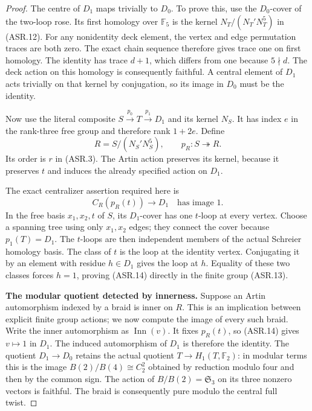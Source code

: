 \begin{proof}
The centre of $D_1$ maps trivially to $D_0$.
To prove this, use the $D_0$-cover of the two-loop rose.
Its first homology over $\mathbb F_5$ is the kernel
$N_T/(N_T'N_T^5)$ in (ASR.12).
For any nonidentity deck element, the vertex and edge
permutation traces are both zero.  The exact chain sequence
therefore gives trace one on first homology.  The identity
has trace $d+1$, which differs from one because $5\nmid d$.
The deck action on this homology is consequently faithful.
A central element of $D_1$ acts trivially on that kernel by
conjugation, so its image in $D_0$ must be the identity.

Now use the literal composite
$S\xrightarrow{p_0}T\xrightarrow{p_1}D_1$ and its kernel
$N_S$.  It has index $e$ in the rank-three free group and
therefore rank $1+2e$.  Define
\[
 R=S/(N_S'N_S^5),\qquad p_R:S\twoheadrightarrow R.
                                                        \tag{ASR.13}
\]
Its order is $r$ in (ASR.3).
The Artin action preserves its kernel, because it preserves
$t$ and induces the already specified action on $D_1$.

The exact centralizer assertion required here is
\[
 C_R(p_R(t))\longrightarrow D_1\quad\text{has image }1.
                                                        \tag{ASR.14}
\]
In the free basis $x_1,x_2,t$ of $S$, its $D_1$-cover has
one $t$-loop at every vertex.  Choose a spanning tree using
only $x_1,x_2$ edges; they connect the cover because
$p_1(T)=D_1$.
The $t$-loops are then independent members of the actual
Schreier homology basis.  The class of $t$ is the loop at
the identity vertex.  Conjugating it by an element with
residue $h\in D_1$ gives the loop at $h$.
Equality of these two classes forces $h=1$, proving
(ASR.14) directly in the finite group (ASR.13).

\par\medskip\noindent\textbf{The modular quotient detected by innerness.}
Suppose an Artin automorphism indexed by a braid is inner
on $R$.  This is an implication between explicit finite
group actions; we now compute the image of every such braid.
Write the inner automorphism as $\operatorname{Inn}(v)$.
It fixes $p_R(t)$, so (ASR.14) gives $v\mapsto1$ in $D_1$.
The induced automorphism of $D_1$ is therefore the identity.
The quotient $D_1\to D_0$ retains the actual quotient
$T\to H_1(T,\mathbb F_2)$: in modular terms this is the
image $B(2)/B(4)\cong C_2^2$ obtained by reduction modulo
four and then by the common sign.
The action of $B/B(2)=\mathfrak S_3$ on its three nonzero
vectors is faithful.  The braid is consequently pure
modulo the central full twist.


\end{proof}
